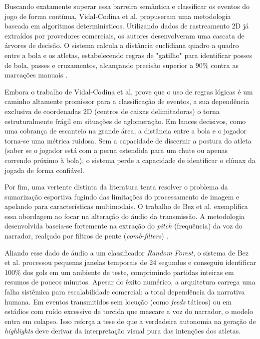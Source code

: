 \documentclass[a4paper,10pt, twocolumn]{article}
\begin{document}
Buscando exatamente superar essa barreira semântica e classificar os eventos do jogo de forma contínua, Vidal-Codina et al. \cite{vidal2022automatic} propuseram uma metodologia baseada em algoritmos determinísticos. Utilizando dados de rastreamento 2D já extraídos por provedores comerciais, os autores desenvolveram uma cascata de árvores de decisão. O sistema calcula a distância euclidiana quadro a quadro entre a bola e os atletas, estabelecendo regras de "gatilho" para identificar posses de bola, passes e cruzamentos, alcançando precisão superior a 90\% contra as marcações manuais \cite{vidal2022automatic}.

Embora o trabalho de Vidal-Codina et al. prove que o uso de regras lógicas é um caminho altamente promissor para a classificação de eventos, a sua dependência exclusiva de coordenadas 2D (centros de caixas delimitadoras) o torna estruturalmente frágil em situações de aglomeração. Em lances decisivos, como uma cobrança de escanteio na grande área, a distância entre a bola e o jogador torna-se uma métrica ruidosa. Sem a capacidade de discernir a postura do atleta (saber se o jogador está com a perna estendida para um chute ou apenas correndo próximo à bola), o sistema perde a capacidade de identificar o clímax da jogada de forma confiável.

Por fim, uma vertente distinta da literatura tenta resolver o problema da sumarização esportiva fugindo das limitações do processamento de imagem e apelando para características multimodais. O trabalho de Bez et al. \cite{bez2021multimodal} exemplifica essa abordagem ao focar na alteração do áudio da transmissão. A metodologia desenvolvida baseia-se fortemente na extração do \textit{pitch} (frequência) da voz do narrador, realçado por filtros de pente (\textit{comb-filters}) \cite{bez2021multimodal}. 

Aliando esse dado de áudio a um classificador \textit{Random Forest}, o sistema de Bez et al. processou pequenas janelas temporais de 24 segundos e conseguiu identificar 100\% dos gols em um ambiente de teste, comprimindo partidas inteiras em resumos de poucos minutos. Apesar do êxito numérico, a arquitetura carrega uma falha sistêmica para escalabilidade comercial: a total dependência da narrativa humana. Em eventos transmitidos sem locução (como \textit{feeds} táticos) ou em estádios com ruído excessivo de torcida que mascare a voz do narrador, o modelo entra em colapso. Isso reforça a tese de que a verdadeira autonomia na geração de \textit{highlights} deve derivar da interpretação visual pura das intenções dos atletas.
\end{document}
